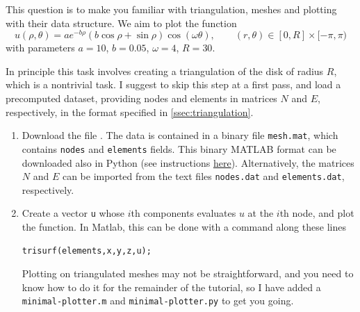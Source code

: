 \documentclass[a4paper]{siamonline220329}
\theoremstyle{plain}
\begin{document}
\begin{question}
  This question is to make you familiar with triangulation, meshes and plotting
  with their data structure. We aim to plot the function
  \[
    u(\rho,\theta) = a e^{-b \rho}(b\cos \rho  + \sin \rho ) \cos(\omega \theta),
    \qquad (r,\theta) \in [0,R] \times [-\pi,\pi)
  \]
  with parameters $a =10$, $b = 0.05$, $\omega =4$, $R = 30$. 

  In principle this task involves creating a triangulation of the disk of radius $R$,
  which is a nontrivial task. I suggest to skip this step at a first pass, and
  load a precomputed dataset, providing nodes and elements in matrices $N$ and
  $E$, respectively, in the format specified in \cref{ssec:triangulation}.

  \begin{enumerate}
    \item Download the file . The data is contained in a binary file
      \texttt{mesh.mat}, which contains \texttt{nodes} and \texttt{elements} fields.
      This binary MATLAB format can be downloaded also in Python (see instructions
      \href{https://docs.scipy.org/doc/scipy/reference/generated/scipy.io.loadmat.html}{here}).
      Alternatively, the matrices $N$ and $E$ can be imported from the text files
      \texttt{nodes.dat} and \texttt{elements.dat}, respectively.
    \item Create a vector \texttt{u} whose $i$th components evaluates $u$ at the
      $i$th node, and plot the function. In Matlab, this can be done with a command
      along these lines
      \begin{lstlisting}[numbers=none]
trisurf(elements,x,y,z,u);
      \end{lstlisting}
      Plotting on triangulated meshes may not be straightforward, and you need to
      know how to do it for the remainder of the tutorial, so I have added a
      \lstinline|minimal-plotter.m| and \lstinline|minimal-plotter.py| to get you
      going. 
  \end{enumerate}
\end{question}
\end{document}
